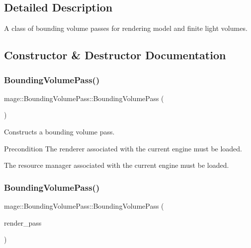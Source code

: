 \subsection{Detailed Description}
A class of bounding volume passes for rendering model and finite light volumes. 

\subsection{Constructor \& Destructor Documentation}
\hypertarget{classmage_1_1_bounding_volume_pass_ab32eb9086e463f5260f8999b78b55b26}{}\label{classmage_1_1_bounding_volume_pass_ab32eb9086e463f5260f8999b78b55b26} 
\subsubsection{\texorpdfstring{Bounding\+Volume\+Pass()}{BoundingVolumePass()}\hspace{0.1cm}{\footnotesize\ttfamily [1/3]}}
{\footnotesize\ttfamily mage\+::\+Bounding\+Volume\+Pass\+::\+Bounding\+Volume\+Pass (\begin{DoxyParamCaption}{ }\end{DoxyParamCaption})}

Constructs a bounding volume pass.

\begin{DoxyPrecond}{Precondition}
The renderer associated with the current engine must be loaded. 

The resource manager associated with the current engine must be loaded. 
\end{DoxyPrecond}
\hypertarget{classmage_1_1_bounding_volume_pass_a21408cc53051c9c6d94efe41b3bea404}{}\label{classmage_1_1_bounding_volume_pass_a21408cc53051c9c6d94efe41b3bea404} 
\subsubsection{\texorpdfstring{Bounding\+Volume\+Pass()}{BoundingVolumePass()}\hspace{0.1cm}{\footnotesize\ttfamily [2/3]}}
{\footnotesize\ttfamily mage\+::\+Bounding\+Volume\+Pass\+::\+Bounding\+Volume\+Pass (\begin{DoxyParamCaption}\item[{const \hyperlink{classmage_1_1_bounding_volume_pass}{Bounding\+Volume\+Pass} \&}]{render\+\_\+pass }\end{DoxyParamCaption})\hspace{0.3cm}{\ttfamily [delete]}}

